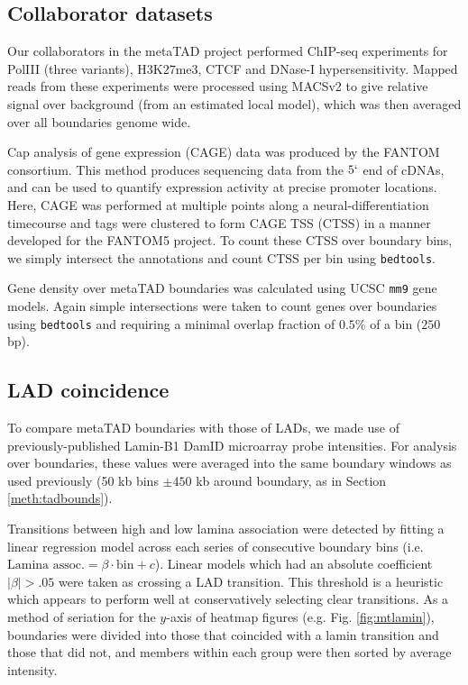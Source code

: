 \documentclass[a4paper,11pt,oneside]{book}
\begin{document}
\subsection{Collaborator datasets}\label{meth:metadata}
Our collaborators in the metaTAD project performed ChIP-seq experiments for PolIII (three variants), H$3$K$27$me$3$, CTCF and DNase-I hypersensitivity. Mapped reads from these experiments were processed using MACSv2\cite{Zhang2008} to give relative signal over background (from an estimated local model), which was then averaged over all boundaries genome wide. 

Cap analysis of gene expression (CAGE) data was produced by the FANTOM consortium.\cite{fantom5, itoh2012a} This method produces sequencing data from the $5`$ end of cDNAs, and can be used to quantify expression activity at precise promoter locations.\cite{Kodzius2006} Here, CAGE was performed at multiple points along a neural-differentiation timecourse and tags were clustered to form CAGE TSS (CTSS) in a manner developed for the FANTOM5 project.\cite{fantom5} To count these CTSS over boundary bins, we simply intersect the annotations and count CTSS per bin using \texttt{bedtools}.\cite{Quinlan2010}

Gene density over metaTAD boundaries was calculated using UCSC \texttt{mm9} gene models.\cite{Karolchik2014} Again simple intersections were taken to count genes over boundaries using \texttt{bedtools}\cite{Quinlan2010} and requiring a minimal overlap fraction of $0.5\%$ of a bin ($250$ bp).

\subsection{LAD coincidence}\label{meth:metalad}

To compare metaTAD boundaries with those of LADs, we made use of previously-published Lamin-B1 DamID microarray probe intensities.\citet{Peric-Hupkes2010} For analysis over boundaries, these values were averaged into the same boundary windows as used previously (50 kb bins $\pm450$ kb around boundary, as in Section \ref{meth:tadbounds}). 

Transitions between high and low lamina association were detected by fitting a linear regression model across each series of consecutive boundary bins (i.e. $\textrm{Lamina assoc.}=\beta\cdot\textrm{bin} + c$). Linear models which had an absolute coefficient $|\beta| >.05$ were taken as crossing a LAD transition. This threshold is a heuristic which appears to perform well at conservatively selecting clear transitions. As a method of seriation for the $y$-axis of heatmap figures (e.g. Fig. \ref{fig:mtlamin}), boundaries were divided into those that coincided with a lamin transition and those that did not, and members within each group were then sorted by average intensity. 
\end{document}
